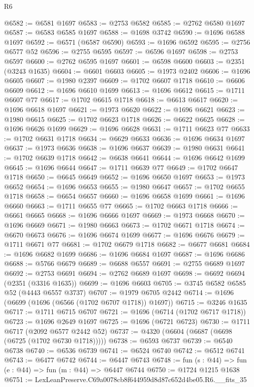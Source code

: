 \begin{lexlean}{R6}
\begin{coremodule}
@6582 := @6581 @1697
@6583 := @2753 @6582
@6585 := @2762 @6580 @1697
@6587 := @6583 @6585 @1697
@6588 := @1698 @3742
@6590 := @1696 @6588 @1697
@6592 := @6571 (@6587 @6590)
@6593 := @1696 @6592
@6595 := @2756 @6577 @52
@6596 := @2755 @6595
@6597 := @6596 @1697
@6598 := @2753 @6597
@6600 := @2762 @6595 @1697
@6601 := @6598 @6600
@6603 := @2351 (@3243 @1635)
@6604 := @6601 @6603
@6605 := @1973 @2402
@6606 := @1696 @6605
@6607 := @1980 @2397
@6609 := @1702 @6607 @1718
@6610 := @6606 @6609
@6612 := @1696 @6610 @1699
@6613 := @1696 @6612
@6615 := @1711 @6607 @77
@6617 := @1702 @6615 @1718
@6618 := @6613 @6617
@6620 := @1696 @6618 @1697
@6621 := @1973 @6620
@6622 := @1696 @6621
@6623 := @1980 @6615
@6625 := @1702 @6623 @1718
@6626 := @6622 @6625
@6628 := @1696 @6626 @1699
@6629 := @1696 @6628
@6631 := @1711 @6623 @77
@6633 := @1702 @6631 @1718
@6634 := @6629 @6633
@6636 := @1696 @6634 @1697
@6637 := @1973 @6636
@6638 := @1696 @6637
@6639 := @1980 @6631
@6641 := @1702 @6639 @1718
@6642 := @6638 @6641
@6644 := @1696 @6642 @1699
@6645 := @1696 @6644
@6647 := @1711 @6639 @77
@6649 := @1702 @6647 @1718
@6650 := @6645 @6649
@6652 := @1696 @6650 @1697
@6653 := @1973 @6652
@6654 := @1696 @6653
@6655 := @1980 @6647
@6657 := @1702 @6655 @1718
@6658 := @6654 @6657
@6660 := @1696 @6658 @1699
@6661 := @1696 @6660
@6663 := @1711 @6655 @77
@6665 := @1702 @6663 @1718
@6666 := @6661 @6665
@6668 := @1696 @6666 @1697
@6669 := @1973 @6668
@6670 := @1696 @6669
@6671 := @1980 @6663
@6673 := @1702 @6671 @1718
@6674 := @6670 @6673
@6676 := @1696 @6674 @1699
@6677 := @1696 @6676
@6679 := @1711 @6671 @77
@6681 := @1702 @6679 @1718
@6682 := @6677 @6681
@6684 := @1696 @6682 @1699
@6686 := @1696 @6684 @1697
@6687 := @1696 @6686
@6688 := @5766 @6679
@6689 := @6688 @6557
@6691 := @2755 @6689 @1697
@6692 := @2753 @6691
@6694 := @2762 @6689 @1697
@6698 := @6692 @6694 (@2351 (@3316 @1635))
@6699 := @1696 @6603
@6705 := @3745 @6582 @6585 @52 (@4443 @6557 @3737)
@6707 := @1979 @6705 @2442
@6714 := @1696 (@6699 (@1696 (@6566 (@1702 @6707 @1718)) @1697))
@6715 := @3246 @1635
@6717 := @1711 @6715 @6707
@6721 := @1696 (@6714 (@1702 @6717 @1718))
@6723 := @1696 @2649 @1697
@6725 := @1696 (@6721 @6723)
@6730 := @1711 @6717 (@2092 @6577 @2442 @52)
@6737 := @4320 (@6604 (@6687 (@6698 (@6725 (@1702 @6730 @1718)))))
@6738 := @6593 @6737
@6739 := @6540 @6738
@6740 := @6536 @6739
@6741 := @6524 @6740
@6742 := @6512 @6741
@6743 := @6477 @6742
@6744 := @6447 @6743
@6748 := fun (s : @44) => fun (e : @44) => fun (m : @44) => @6447 @6744
@6750 := @1724 @1215 @1638
@6751 := LexLeanPreserve.C69a0078cb8f644959d8d87c652d4be05.R6.__fits_35

\end{coremodule}
\end{lexlean}
